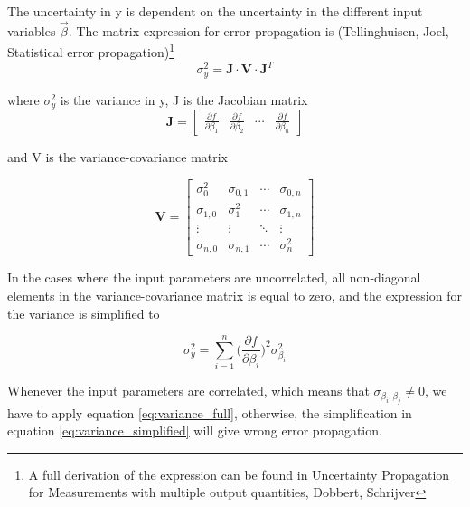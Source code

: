\documentclass[a4paper,11pt,twoside]{book}
\begin{document}
\noindent The uncertainty in y is dependent on the uncertainty in the different input variables $ \vec{\beta}$. The matrix expression for error propagation is (Tellinghuisen, Joel, Statistical error propagation)\footnote{A full derivation of the expression can be found in Uncertainty Propagation for Measurements with multiple output quantities, Dobbert, Schrijver}
\begin{equation} \label{eq:variance_full}
    \sigma^2_y = \mathbf{J}\cdot \mathbf{V}\cdot \mathbf{J}^T 
\end{equation} 

\noindent where $\sigma^2_y$ is the variance in y, J is the Jacobian matrix
\begin{equation}
\mathbf{J} = 
    \begin{bmatrix}
       \frac{\partial f}{\partial \beta_1} &  \frac{\partial f}{\partial \beta_2} & \cdots & \frac{ \partial f}{\partial \beta_n}
    \end{bmatrix}
\end{equation}

\noindent and V is the variance-covariance matrix 

\begin{equation}
\mathbf{V} = 
\begin{bmatrix}
  \sigma_0^2 & \sigma_{0,1} & \cdots & \sigma_{0,n} \\
  \sigma_{1,0} & \sigma_{1}^2 & \cdots & \sigma_{1,n} \\
  \vdots  & \vdots  & \ddots & \vdots  \\
  \sigma_{n,0} & \sigma_{n,1} & \cdots & \sigma_{n}^2
 \end{bmatrix}
\end{equation}


\noindent In the cases where the input parameters are uncorrelated, all non-diagonal elements in the variance-covariance matrix is equal to zero, and the expression for the variance is simplified to 

\begin{equation} \label{eq:variance_simplified}
    \sigma_y^2 = \sum_{i=1}^n \Big(\frac{\partial f}{\partial \beta_i } \Big)^2 \sigma_{\beta_i}^2
\end{equation}

\noindent Whenever the input parameters are correlated, which means that $\sigma_{\beta_i, \beta_j}\neq 0$, we have to apply equation \ref{eq:variance_full}, otherwise, the simplification in equation \ref{eq:variance_simplified} will give wrong error propagation. \\
\end{document}
